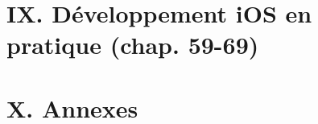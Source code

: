\documentclass[11pt,a4paper,openany]{book}
\begin{document}
\part*{IX. Développement iOS en pratique (chap. 59-69)}











\appendix
\part*{X. Annexes}









\end{document}
